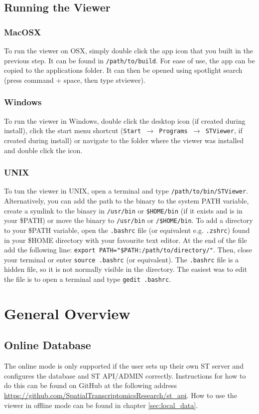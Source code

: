\documentclass[10pt,a4paper,titlepage]{book}
\begin{document}
\section{Running the Viewer}
\subsection*{MacOSX}
To run the viewer on OSX, simply double click the app icon that you built in the previous step. It can be found in \texttt{/path/to/build}. For ease of use, the app can be copied to the applications folder. It can then be opened using spotlight search (press command + space, then type stviewer).

\subsection*{Windows}
To run the viewer in Windows, double click the desktop icon (if created during install), click the start menu shortcut (\texttt{Start $\rightarrow$ Programs $\rightarrow$ STViewer}, if created during install) or navigate to the folder where the viewer was installed and double click the icon.

\subsection*{UNIX}
To tun the viewer in UNIX, open a terminal and type \texttt{/path/to/bin/STViewer}. Alternatively, you can add the path to the binary to the system PATH variable, create a symlink to the binary in \texttt{/usr/bin} or \texttt{\$HOME/bin} (if it exists and is in your \$PATH) or move the binary to \texttt{/usr/bin} or \texttt{/\$HOME/bin}. To add a directory to your \$PATH variable, open the \texttt{.bashrc} file (or equivalent e.g. \texttt{.zshrc}) found in your \$HOME directory with your favourite text editor. At the end of the file add the following line: \texttt{export PATH="\$PATH:/path/to/directory/"}. Then, close your terminal or enter \texttt{source .bashrc} (or equivalent). The \texttt{.bashrc} file is a hidden file, so it is not normally visible in the directory. The easiest was to edit the file is to open a terminal and type \texttt{gedit .bashrc}.

\chapter{General Overview}
\section{Online Database}
The online mode is only supported if the user sets up their own ST server and configures the database and ST API/ADMIN correctly. Instructions for how to do this can be found on GitHub at the following address \url{https://github.com/SpatialTranscriptomicsResearch/st_api}. How to use the viewer in offline mode can be found in chapter \ref{sec:local_data}.
\end{document}
